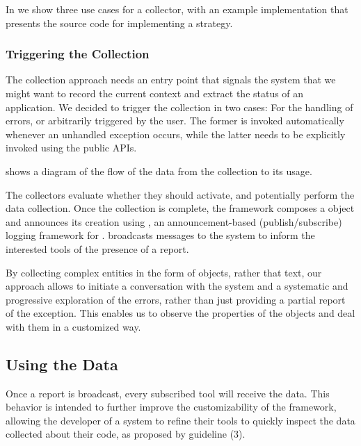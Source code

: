 
In  we show three use cases for a collector, with an example implementation that presents the source code for implementing a strategy.


\subsubsection{Triggering the Collection}

The collection approach needs an entry point that signals the system that we might want to record the current context and extract the status of an application.
We decided to trigger the collection in two cases: For the handling of errors, or arbitrarily triggered by the user.
The former is invoked automatically whenever an unhandled exception occurs, while the latter needs to be explicitly invoked using the \sln public APIs.

 shows a diagram of the flow of the data from the collection to its usage.

The collectors evaluate whether they should activate, and potentially perform the data collection.
Once the collection is complete, the framework composes a  object and announces its creation using \bea, an announcement-based (\ie publish/subscribe) logging framework for \pha.
\bea broadcasts messages to the system to inform the interested tools of the presence of a report.

By collecting complex entities in the form of objects, rather that text, our approach allows to initiate a conversation with the system and a systematic and progressive exploration of the errors, rather than just providing a partial report of the exception.
This enables us to observe the properties of the objects and deal with them in a customized way.

\subsection{Using the Data}\label{sec:reified-tools}

Once a report is broadcast, every subscribed tool will receive the data.
This behavior is intended to further improve the customizability of the framework, allowing the developer of a system to refine their tools to quickly inspect the data collected about their code, as proposed by guideline (3).

